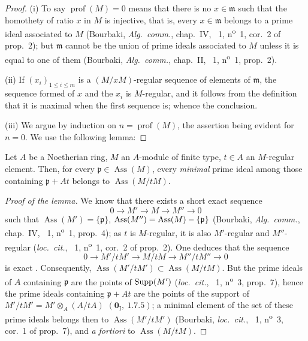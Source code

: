 \begin{proof}
(i) To say $\operatorname{prof}(M)=0$ means that there is no $x\in\mathfrak{m}$ such that the homothety of ratio $x$ in $M$ is injective, that is, every $x\in\mathfrak{m}$ belongs to a prime ideal associated to $M$ (Bourbaki, \emph{Alg.~comm.}, chap.~IV, \textsection~1, n\textsuperscript{o}~1, cor.~2 of prop.~2); but $\mathfrak{m}$ cannot be the union of prime ideals associated to $M$ unless it is equal to one of them (Bourbaki, \emph{Alg.~comm.}, chap.~II, \textsection~1, n\textsuperscript{o}~1, prop.~2).

(ii) If $(x_i)_{1\leq i\leq m}$ is a $(M/x M)$-regular sequence of elements of $\mathfrak{m}$, the sequence formed of $x$ and the $x_i$ is $M$-regular, and it follows from the definition that it is maximal when the first sequence is; whence the conclusion.

(iii) We argue by induction on $n=\operatorname{prof}(M)$, the assertion being evident for $n=0$.
We use the following lemma:
\end{proof}

\begin{lemma}[16.4.6.3]
\label{0.16.4.6.3}
Let $A$ be a Noetherian ring, $M$ an $A$-module of finite type, $t\in A$ an $M$-regular element.
Then, for every $\mathfrak{p}\in\operatorname{Ass}(M)$, every \emph{minimal} prime ideal among those containing $\mathfrak{p}+At$ belongs to $\operatorname{Ass}(M/t M)$.
\end{lemma}

\begin{proof}[Proof of the lemma]
We know that there exists a short exact sequence
\[
  0\to M'\to M\to M''\to 0
\]
such that $\operatorname{Ass}(M')=\{\mathfrak{p}\}$, $\operatorname{Ass}(M'')=\operatorname{Ass}(M)-\{\mathfrak{p}\}$ (Bourbaki, \emph{Alg.~comm.}, chap.~IV, \textsection~1, n\textsuperscript{o}~1, prop.~4); as $t$ is $M$-regular, it is also $M'$-regular and $M''$-regular (\emph{loc.~cit.}, \textsection~1, n\textsuperscript{o}~1, cor.~2 of prop.~2).
One deduces that the sequence
\[
  0\to M'/t M'\to M/t M\to M''/t M''\to 0
\]
is exact .
Consequently, $\operatorname{Ass}(M'/t M')\subset\operatorname{Ass}(M/t M)$.
But the prime ideals of $A$ containing $\mathfrak{p}$ are the points of $\operatorname{Supp}(M')$ (\emph{loc.~cit.}, \textsection~1, n\textsuperscript{o}~3, prop.~7), hence the prime ideals containing $\mathfrak{p}+At$ are the points of the support of $M'/t M'=M'\otimes_A(A/t A)$ $(\mathbf{0}_\mathrm{I},~1.7.5)$; a minimal element of the set of these prime ideals belongs then to $\operatorname{Ass}(M'/t M')$ (Bourbaki, \emph{loc.~cit.}, \textsection~1, n\textsuperscript{o}~3, cor.~1 of prop.~7), and \emph{a fortiori} to $\operatorname{Ass}(M/t M)$.
\end{proof}

